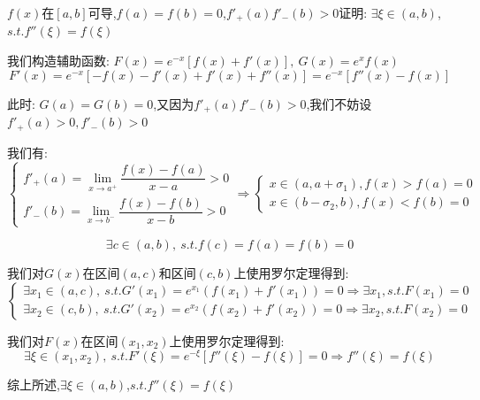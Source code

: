 \begin{proposition}
	$f(x)$在$[a,b]$可导,$f(a)=f(b)=0$,$f'_{+}(a)f'_{-}(b)>0$证明: $\exists \xi\in(a,b)$,$s.t. f''(\xi)=f(\xi)$
\end{proposition}
\begin{solution}

	我们构造辅助函数: $F(x)=e^{-x}[f(x)+f'(x)],\ G(x)=e^{x}f(x)$
	$$F'(x)=e^{-x}[-f(x)-f'(x)+f'(x)+f''(x)]=e^{-x}[f''(x)-f(x)]$$

	此时: $G(a)=G(b)=0$,又因为$f'_{+}(a)f'_{-}(b)>0$,我们不妨设$f'_{+}(a)>0,f'_{-}(b)>0$

	我们有: $$\left\lbrace
		\begin{array}{l}
			f'_{+}(a)=\lim\limits_{x\rightarrow a^{+}}\dfrac{f(x)-f(a)}{x-a}>0 \\
			f'_{-}(b)=\lim\limits_{x\rightarrow b^{-}}\dfrac{f(x)-f(b)}{x-b}>0
		\end{array}
		\right. \Rightarrow \left\lbrace
		\begin{array}{l}
			x\in(a,a+\sigma_{1}),f(x)>f(a)=0 \\
			x\in(b-\sigma_{2},b),f(x)<f(b)=0
		\end{array}
		\right. $$

	$$\exists c\in(a,b),\ s.t. f(c)=f(a)=f(b)=0$$

	我们对$G(x)$在区间$(a,c)$和区间$(c,b)$上使用罗尔定理得到:
	$$\left\lbrace
		\begin{array}{l}
			\exists x_{1}\in(a,c),\ s.t. G'(x_{1})=e^{x_{1}}(f(x_{1})+f'(x_{1}))=0\Rightarrow \exists x_{1},s.t. F(x_{1})=0 \\
			\exists x_{2}\in(c,b),\ s.t. G'(x_{2})=e^{x_{2}}(f(x_{2})+f'(x_{2}))=0\Rightarrow \exists x_{2},s.t. F(x_{2})=0
		\end{array}
		\right. $$

	我们对$F(x)$在区间$(x_{1},x_{2})$上使用罗尔定理得到:
	$$\exists \xi\in(x_{1},x_{2}),\ s.t. F'(\xi)=e^{-\xi}[f''(\xi)-f(\xi)]=0\Rightarrow f''(\xi)=f(\xi)$$

	综上所述,$\exists \xi\in(a,b)$,$s.t. f''(\xi)=f(\xi)$
\end{solution}


